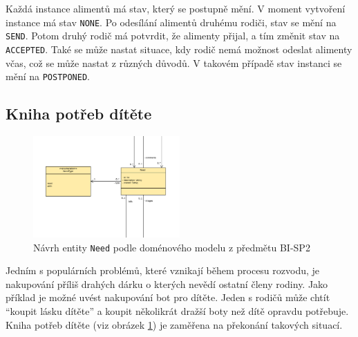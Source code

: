         Každá instance alimentů má stav, který se postupně mění. V moment vytvoření instance má stav \verb|NONE|. Po odesílání alimentů druhému rodiči, stav se mění na \verb|SEND|. Potom druhý rodič má potvrdit, že alimenty přijal, a tím změnit stav na \verb|ACCEPTED|. Také se může nastat situace, kdy rodič nemá možnost odeslat alimenty včas, což se může nastat z různých důvodů. V takovém případě stav instanci se mění na \verb|POSTPONED|.
    
    \subsection{Kniha potřeb dítěte}\label{analyza:navrh:need}
        \begin{figure}\centering
	        \includegraphics[width=0.5\textwidth]{pdfs/Need1}
	        \caption[Návrh \texttt{Need}]{Návrh entity \texttt{Need} podle doménového modelu z předmětu BI-SP2}\label{image:Need1}
        \end{figure}
        Jedním s populárních problémů, které vznikají během procesu rozvodu, je nakupování příliš drahých dárku o kterých nevědí ostatní členy rodiny. Jako příklad je možné uvést nakupování bot pro dítěte. Jeden s rodičů může chtít \enquote{koupit lásku dítěte} a koupit několikrát dražší boty než dítě opravdu potřebuje. Kniha potřeb dítěte (viz obrázek \ref{image:Need1}) je zaměřena na překonání takových situací.
        
